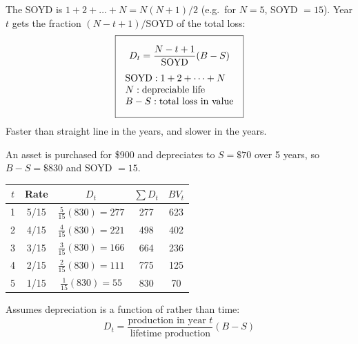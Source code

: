 \begin{definition}
    The SOYD is $1 + 2 + \dots + N = N(N+1)/2$ (e.g.\ for $N = 5$, SOYD
    $= 15$). Year $t$ gets the fraction $(N - t + 1)/\text{SOYD}$ of the
    total loss:
    \[\boxed{\begin{gathered}
        D_t = \frac{N - t + 1}{\text{SOYD}}(B - S)\\[4pt]
        \begin{array}{@{}l@{}}
            \text{SOYD}: 1 + 2 + \dots + N\\
            N: \text{depreciable life}\\
            B - S: \text{total loss in value}
        \end{array}
    \end{gathered}}\]
    Faster than straight line in the  years, and slower in the
     years.
\end{definition}

\begin{example}
    An asset is purchased for \$900 and depreciates to $S = \$70$ over 5
    years, so $B - S = \$830$ and SOYD $= 15$.
    \begin{center}
    \begin{tabular}{ccccc}
        \toprule
        $t$ & Rate & $D_t$ & $\sum D_t$ & $BV_t$ \\
        \midrule
        1 & 5/15 & $\frac{5}{15}(830) = 277$ & 277 & 623 \\
        2 & 4/15 & $\frac{4}{15}(830) = 221$ & 498 & 402 \\
        3 & 3/15 & $\frac{3}{15}(830) = 166$ & 664 & 236 \\
        4 & 2/15 & $\frac{2}{15}(830) = 111$ & 775 & 125 \\
        5 & 1/15 & $\frac{1}{15}(830) = 55$ & 830 & 70 \\
        \bottomrule
    \end{tabular}
    \end{center}
\end{example}

\begin{definition}
    Assumes depreciation is a function of  rather than
    time:
    \[\boxed{D_t = \frac{\text{production in year } t}{\text{lifetime production}}(B - S)}\]
\end{definition}

